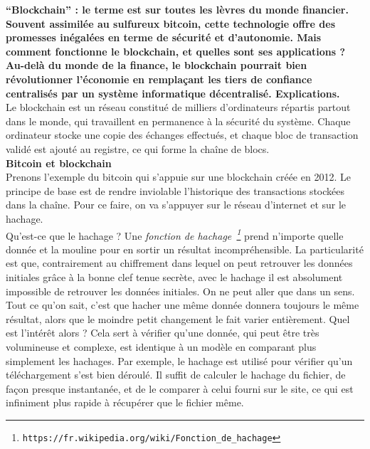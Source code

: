 \documentclass[11pt,twoside,a4paper]{article}
\begin{document}
\textbf{``Blockchain'' : le terme est sur toutes les l{\`e}vres du monde financier. Souvent assimil{\'e}e au sulfureux bitcoin, cette technologie offre des promesses in{\'e}gal{\'e}es en terme de s{\'e}curit{\'e} et d'autonomie. Mais comment fonctionne le blockchain, et quelles sont ses applications ?}~\\
\textbf{Au-del{\`a} du monde de la finance, le blockchain pourrait bien r{\'e}volutionner l'{\'e}conomie en rempla\c{c}ant les tiers de confiance centralis{\'e}s par un syst{\`e}me informatique d{\'e}centralis{\'e}. Explications. }~\\

Le blockchain est un r{\'e}seau constitu{\'e} de milliers d'ordinateurs r{\'e}partis partout dans le monde, qui travaillent en permanence {\`a} la s{\'e}curit{\'e} du syst{\`e}me. Chaque ordinateur stocke une copie des {\'e}changes effectu{\'e}s, et chaque bloc de transaction valid{\'e} est ajout{\'e} au registre, ce qui forme la cha{\^i}ne de blocs.~\\

\textbf{Bitcoin et blockchain}~\\

Prenons l'exemple du bitcoin qui s'appuie sur une blockchain cr{\'e}{\'e}e en 2012. Le principe de base est de rendre inviolable l'historique des transactions stock{\'e}es dans la cha{\^i}ne. Pour ce faire, on va s'appuyer sur le r{\'e}seau d'internet et sur le hachage.~\\
Qu'est-ce que le hachage ? Une \emph{fonction de hachage~\footnote{\texttt{https://fr.wikipedia.org/wiki/Fonction\_de\_hachage}}} prend n'importe quelle donn{\'e}e et la mouline pour en sortir un r{\'e}sultat incompr{\'e}hensible. La particularit{\'e} est que, contrairement au chiffrement dans lequel on peut retrouver les donn{\'e}es initiales gr{\^a}ce {\`a} la bonne clef tenue secr{\`e}te, avec le hachage il est absolument impossible de retrouver les donn{\'e}es initiales. On ne peut aller que dans un sens. Tout ce qu'on sait, c'est que hacher une m{\^e}me donn{\'e}e donnera toujours le m{\^e}me r{\'e}sultat, alors que le moindre petit changement le fait varier enti{\`e}rement. Quel est l'int{\'e}r{\^e}t alors ? Cela sert {\`a} v{\'e}rifier qu'une donn{\'e}e, qui peut {\^e}tre tr{\`e}s volumineuse et complexe, est identique {\`a} un mod{\`e}le en comparant plus simplement les hachages. Par exemple, le hachage est utilis{\'e} pour v{\'e}rifier qu'un t{\'e}l{\'e}chargement s'est bien d{\'e}roul{\'e}. Il suffit de calculer le hachage du fichier, de fa\c{c}on presque instantan{\'e}e, et de le comparer {\`a} celui fourni sur le site, ce qui est infiniment plus rapide {\`a} r{\'e}cup{\'e}rer que le fichier m{\^e}me.~\\
\end{document}

